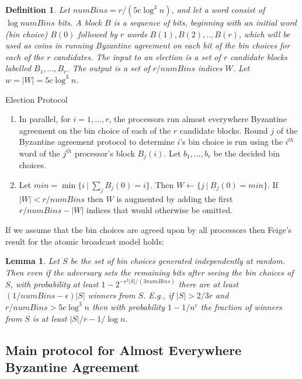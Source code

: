 \documentclass[letterpaper,11pt]{article}
\newtheorem{lemma}{Lemma}
\newtheorem{definition}{Definition}
\begin{document}
\begin{definition}
Let $numBins = r/ (5c \log^3 n)$, and let a \emph{word} consist of $\log numBins$ bits.  A {\it block} $B$ is a sequence of bits, beginning with an initial word (bin choice) $B(0)$ followed by $r$ words $B(1), B(2),..,B(r) $, which will be used as coins in running Byzantine agreement on each bit of the bin choices for each of the $r$ candidates.  The input to an election is a set of $r$ candidate blocks labelled $B_1,...,B_r$. The output is 
a set of $r/numBins$ indices $W$.  Let $w=|W|=5c \log^3 n$.
  
 \end{definition}

\begin{algorithm}\label{a:ep}
\caption{Election Protocol}
\begin{enumerate}
\item In parallel, for $i=1,...,r$, the processors run almost everywhere Byzantine agreement on the bin choice of each of the $r$ candidate blocks.  Round  $j$ of the Byzantine agreement protocol to determine  $i$'s bin choice  is run  using the $i^{th}$ word of the  $j^{th}$ processor's block $B_j(i)$.   Let $b_1,...,b_r$ be the decided bin choices.
\item
Let  $min  =\min\{i  ~|~  \sum_j B_j(0)=i \}$. Then   $W \leftarrow \{j~|~ B_j(0)=min\}$.
If $|W| < r/numBins$ then $W$ is augmented by adding the first  $r/numBins -|W|$ indices that would otherwise be omitted. 
\end{enumerate} 
\end{algorithm}

If we assume that the bin choices are agreed upon by all processors then Feige's result for the atomic broadcast model holds:

\begin{lemma} \cite{Feige} \label{Feige}
Let $S$ be the set of bin choices generated independently at random. Then even if the adversary sets the remaining bits after seeing the bin choices of $S$, with probability at least $1- 2^{- \epsilon^2 |S|/(3 numBins )}$  there are at least $(1/numBins - \epsilon)|S| $   winners from $S$.  E.g., if  $|S| > 2/3 r$ and
$r/numBins > 5c \log^3  n$  then with probability $1-1/n^c$ the fraction of winners from $S$ is at least $|S|/r  - 1/\log  n$. 
\end{lemma}


\subsection{Main protocol for Almost Everywhere Byzantine Agreement}\label{main}
\end{document}
